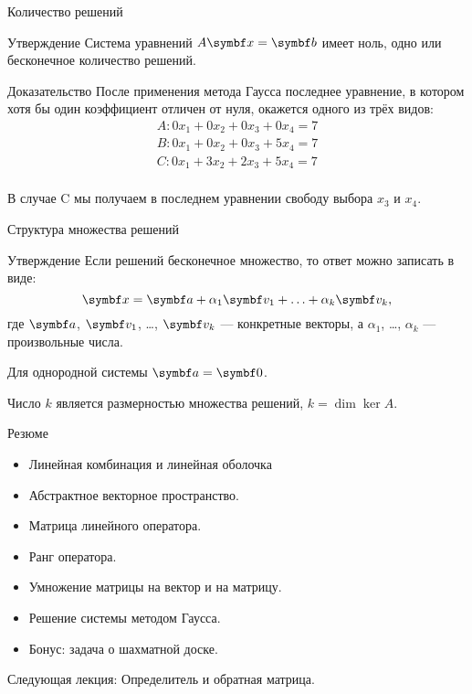 \begin{frame}{Количество решений}
\begin{block}{Утверждение}
Система уравнений $A \bx = \bb$ имеет ноль, одно или бесконечное количество решений. 
\end{block}

\begin{block}{Доказательство}
После применения метода Гаусса последнее уравнение, в котором хотя бы один коэффициент 
отличен от нуля, окажется одного из трёх видов:
\[
\begin{array}{l}
A: 0x_1 + 0x_2 + 0x_3 + 0x_4 = 7 \\    
B: 0x_1 + 0x_2 + 0x_3 + 5x_4 = 7 \\
C: 0x_1 + 3x_2 + 2x_3 + 5x_4 = 7 \\
\end{array}
\]
\end{block}
\pause

В случае C мы получаем в последнем уравнении свободу выбора $x_3$ и $x_4$.

\end{frame}



\begin{frame}{Структура множества решений}

\begin{block}{Утверждение}
Если решений бесконечное множество, то ответ можно записать в виде:
\[
\bx = \ba + \alpha_1 \bv_1 + \ldots + \alpha_k \bv_k,
\]
где $\ba$, $\bv_1$, \ldots, $\bv_k$ — конкретные векторы, а
$\alpha_1$, \ldots, $\alpha_k$ — произвольные числа. 
\end{block}

\pause
Для однородной системы $\ba=\bzero$.

Число $k$ является размерностью множества решений, $k=\dim\ker A$.

\end{frame}




\begin{frame}{Резюме}


\begin{itemize}[<+->]
\item Линейная комбинация и линейная оболочка
\item Абстрактное векторное пространство.
\item Матрица линейного оператора.
\item Ранг оператора. 
\item Умножение матрицы на вектор и на матрицу.
\item Решение системы методом Гаусса.
\item Бонус: задача о шахматной доске.
\end{itemize}
\pause
\alert{Следующая лекция:} Определитель и обратная матрица.



\end{frame}
    